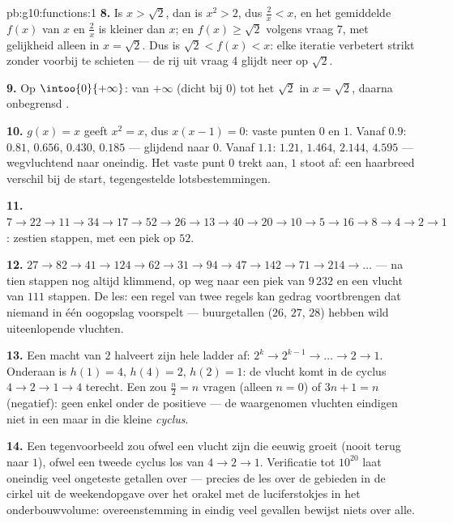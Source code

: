 \begin{solution}{pb:g10:functions:1}
\textbf{8.} Is $x > \sqrt2$, dan is $x^2 > 2$, dus $\frac2x < x$, en het
gemiddelde $f(x)$ van $x$ en $\frac2x$ is kleiner dan $x$; en $f(x) \geq
\sqrt2$ volgens vraag 7, met gelijkheid alleen in $x = \sqrt2$. Dus is
$\sqrt2 < f(x) < x$: elke iteratie verbetert strikt zonder voorbij te
schieten --- de rij uit vraag 4 glijdt neer op $\sqrt2$.

\textbf{9.} Op $\intoo{0}{+\infty}$:  van $+\infty$ (dicht bij $0$)
tot het  $\sqrt2$ in $x = \sqrt2$, daarna onbegrensd .

\textbf{10.} $g(x) = x$ geeft $x^2 = x$, dus $x(x - 1) = 0$: vaste punten
$0$ en $1$. Vanaf $0.9$: $0.81$, $0.656$, $0.430$, $0.185$ --- glijdend naar
$0$. Vanaf $1.1$: $1.21$, $1.464$, $2.144$, $4.595$ --- wegvluchtend naar
oneindig. Het vaste punt $0$ trekt aan, $1$ stoot af: een haarbreed verschil
bij de start, tegengestelde lotsbestemmingen.

\textbf{11.} $7 \to 22 \to 11 \to 34 \to 17 \to 52 \to 26 \to 13 \to 40 \to
20 \to 10 \to 5 \to 16 \to 8 \to 4 \to 2 \to 1$: zestien stappen, met een
piek op $52$.

\textbf{12.} $27 \to 82 \to 41 \to 124 \to 62 \to 31 \to 94 \to 47 \to 142
\to 71 \to 214 \to \dots$ --- na tien stappen nog altijd klimmend, op weg
naar een piek van $9\,232$ en een vlucht van $111$ stappen. De les: een
regel van twee regels kan gedrag voortbrengen dat niemand in één oogopslag
voorspelt --- buurgetallen ($26$, $27$, $28$) hebben wild uiteenlopende
vluchten.

\textbf{13.} Een macht van $2$ halveert zijn hele ladder af:
$2^k \to 2^{k-1} \to \dots \to 2 \to 1$. Onderaan is $h(1) = 4$, $h(4) = 2$,
$h(2) = 1$: de vlucht komt in de cyclus $4 \to 2 \to 1 \to 4$ terecht. Een
 zou $\frac n2 = n$ vragen (alleen $n = 0$) of $3n + 1 = n$
(negatief): geen enkel onder de positieve  --- de
waargenomen vluchten eindigen niet in een  maar in die kleine
\emph{cyclus}.

\textbf{14.} Een tegenvoorbeeld zou ofwel een vlucht zijn die eeuwig groeit
(nooit terug naar $1$), ofwel een tweede cyclus los van $4 \to 2 \to 1$.
Verificatie tot $10^{20}$ laat oneindig veel ongeteste getallen over ---
precies de les over de gebieden in de cirkel uit de weekendopgave over het
orakel met de luciferstokjes in het onderbouwvolume: overeenstemming in
eindig veel gevallen bewijst niets over alle.


\end{solution}
